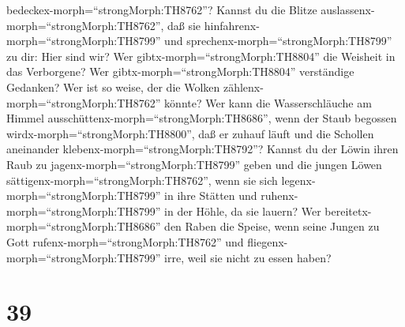 bedeckex-morph=``strongMorph:TH8762''?  Kannst du die
Blitze auslassenx-morph=``strongMorph:TH8762'', daß sie
hinfahrenx-morph=``strongMorph:TH8799'' und
sprechenx-morph=``strongMorph:TH8799'' zu dir: Hier sind wir?
 Wer gibtx-morph=``strongMorph:TH8804'' die Weisheit in das
Verborgene? Wer gibtx-morph=``strongMorph:TH8804'' verständige Gedanken?
 Wer ist so weise, der die Wolken
zählenx-morph=``strongMorph:TH8762'' könnte? Wer kann die
Wasserschläuche am Himmel ausschüttenx-morph=``strongMorph:TH8686'',
 wenn der Staub begossen
wirdx-morph=``strongMorph:TH8800'', daß er zuhauf läuft und die Schollen
aneinander klebenx-morph=``strongMorph:TH8792''?  Kannst du
der Löwin ihren Raub zu jagenx-morph=``strongMorph:TH8799'' geben und
die jungen Löwen sättigenx-morph=``strongMorph:TH8762'', 
wenn sie sich legenx-morph=``strongMorph:TH8799'' in ihre Stätten und
ruhenx-morph=``strongMorph:TH8799'' in der Höhle, da sie lauern?
 Wer bereitetx-morph=``strongMorph:TH8686'' den Raben die
Speise, wenn seine Jungen zu Gott rufenx-morph=``strongMorph:TH8762''
und fliegenx-morph=``strongMorph:TH8799'' irre, weil sie nicht zu essen
haben?

\hypertarget{section-38}{%
\section{39}\label{section-38}}

